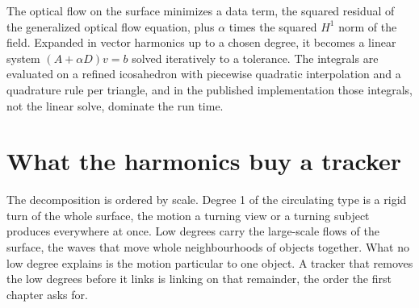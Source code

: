 The optical flow on the surface minimizes a data term, the squared residual of the generalized
optical flow equation, plus \(\alpha\) times the squared \(H^1\) norm of the field. Expanded in vector
harmonics up to a chosen degree, it becomes a linear system \((A + \alpha D)v = b\) solved iteratively
to a tolerance. The integrals are evaluated on a refined icosahedron with piecewise quadratic
interpolation and a quadrature rule per triangle, and in the published implementation those
integrals, not the linear solve, dominate the run time.

\section{What the harmonics buy a tracker}

The decomposition is ordered by scale. Degree 1 of the circulating type is a rigid turn of the whole
surface, the motion a turning view or a turning subject produces everywhere at once. Low degrees
carry the large-scale flows of the surface, the waves that move whole neighbourhoods of objects
together. What no low degree explains is the motion particular to one object. A tracker that removes
the low degrees before it links is linking on that remainder, the order the first chapter
asks for.
